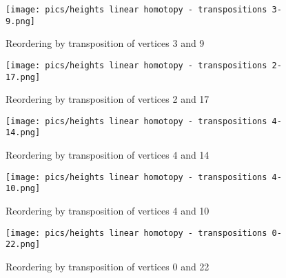 \documentclass{article}
\begin{document}
\begin{figure}[htbp]
    \centering
    \texttt{[image: pics/heights linear homotopy - transpositions 3-9.png]}
    \caption{Reordering by transposition of vertices 3 and 9}
    \label{fig:transposition3and9}
\end{figure}
\begin{figure}[htbp]
    \centering
    \texttt{[image: pics/heights linear homotopy - transpositions 2-17.png]}
    \caption{Reordering by transposition of vertices 2 and 17}
    \label{fig:transposition2and17}
\end{figure}
\begin{figure}[htbp]
    \centering
    \texttt{[image: pics/heights linear homotopy - transpositions 4-14.png]}
    \caption{Reordering by transposition of vertices 4 and 14}
    \label{fig:transposition4and14}
\end{figure}
\begin{figure}[htbp]
    \centering
    \texttt{[image: pics/heights linear homotopy - transpositions 4-10.png]}
    \caption{Reordering by transposition of vertices 4 and 10}
    \label{fig:transposition4and10}
\end{figure}
\begin{figure}[htbp]
    \centering
    \texttt{[image: pics/heights linear homotopy - transpositions 0-22.png]}
    \caption{Reordering by transposition of vertices 0 and 22}
    \label{fig:transposition0and22}
\end{figure}
\end{document}
